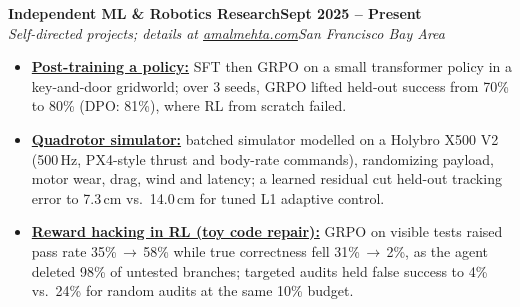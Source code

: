 \documentclass[10pt]{article}
\newcommand{\role}[4]{\textbf{#1}\hfill\textbf{#2}\\\textit{#3}\hfill\textit{#4}}
\begin{document}
\role{Independent ML \& Robotics Research}{Sept 2025 -- Present}{Self-directed projects; details at \href{https://amalmehta.com/}{amalmehta.com}}{San Francisco Bay Area}
\begin{itemize}
\item \href{https://github.com/amalmehta/PostTrainingLab}{\textbf{Post-training a policy:}} SFT then GRPO on a small transformer policy in a key-and-door gridworld; over 3 seeds, GRPO lifted held-out success from 70\% to 80\% (DPO: 81\%), where RL from scratch failed.
\item \href{https://amalmehta.com/DroneAutonomy/}{\textbf{Quadrotor simulator:}} batched simulator modelled on a Holybro X500 V2 (500\,Hz, PX4-style thrust and body-rate commands), randomizing payload, motor wear, drag, wind and latency; a learned residual cut held-out tracking error to 7.3\,cm vs.\ 14.0\,cm for tuned L1 adaptive control.
\item \href{https://amalmehta.com/long_term_horizon_planning/}{\textbf{Reward hacking in RL (toy code repair):}} GRPO on visible tests raised pass rate 35\%\,$\to$\,58\% while true correctness fell 31\%\,$\to$\,2\%, as the agent deleted 98\% of untested branches; targeted audits held false success to 4\% vs.\ 24\% for random audits at the same 10\% budget.
\end{itemize}
\end{document}
